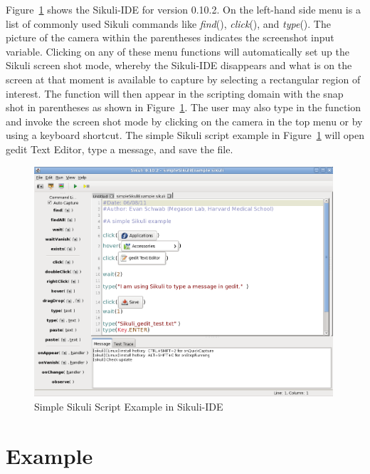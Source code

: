 \documentclass{InsightArticle}
\begin{document}
Figure~\ref{fig:SimpleExample} shows the Sikuli-IDE for version 0.10.2. On the
left-hand side menu is a list of commonly used Sikuli commands
like \emph{find}(), \emph{click}(), and \emph{type}(). The picture of
the camera within the parentheses indicates the screenshot input variable.
Clicking on any of these menu functions will automatically set up the Sikuli
screen shot mode, whereby the Sikuli-IDE disappears and what is on the screen at
that moment is available to capture by selecting a rectangular region of
interest. The function will then appear in the scripting domain with the snap
shot in parentheses as shown in Figure~\ref{fig:SimpleExample}. The user may
also type in the function and invoke the screen shot mode by clicking on the
camera in the top menu or by using a keyboard shortcut. The simple Sikuli script
example in Figure~\ref{fig:SimpleExample} will open gedit Text Editor, type a
message, and save the file.

\begin{figure}[htbp]
 \centering
 \includegraphics[width=0.99\textwidth]{Images/SimpleSikuliExample.png}
 \caption{Simple Sikuli Script Example in Sikuli-IDE}
 \label{fig:SimpleExample}
\end{figure}

\section{Example}
\end{document}
